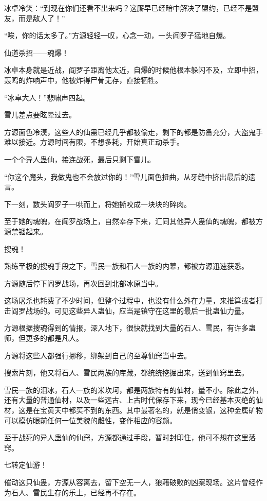\begin{this_body}
冰卓冷笑：“到现在你们还看不出来吗？这厮早已经暗中解决了盟约，已经不是盟友，而是敌人了！”

“唉，你的话太多了。”方源轻轻一叹，心念一动，一头阎罗子猛地自爆。

仙道杀招——魂爆！

冰卓本身就是近战，阎罗子距离他太近，自爆的时候他根本躲闪不及，立即中招，轰鸣的炸响声中，他被炸得尸骨无存，直接牺牲。

“冰卓大人！”悲啸声四起。

雪儿差点要眩晕过去。

方源面色冷漠，这些人的仙蛊已经几乎都被偷走，剩下的都是防备充分，大盗鬼手难以接近。方源时间有限，不想多耗，开始真正动杀手。

一个个异人蛊仙，接连战死，最后只剩下雪儿。

“你这个魔头，我做鬼也不会放过你的！”雪儿面色扭曲，从牙缝中挤出最后的遗言。

下一刻，数头阎罗子一哄而上，将她撕咬成一块块的碎肉。

至于她的魂魄，在阎罗战场上，自然幸存下来，汇同其他异人蛊仙的魂魄，都被方源禁锢起来。

搜魂！

熟练至极的搜魂手段之下，雪民一族和石人一族的内幕，都被方源迅速获悉。

方源随后停下阎罗战场，再次回到北部冰原当中。

这场屠杀也耗费了不少时间，但整个过程中，也没有什么外在力量，来推算或者打击阎罗战场的。可见这些异人蛊仙，应当是镇守在这里的最后一批蛊仙力量。

方源根据搜魂得到的情报，深入地下，很快就找到大量的石人、雪民，有许多蛊师，但更多的都是凡人。

方源将这些人都强行挪移，绑架到自己的至尊仙窍当中去。

搜索片刻，他又将石人、雪民两族的库藏，都统统挖掘出来，送到仙窍里去。

雪民一族的泪冰，石人一族的米坎坷，都是两族特有的仙材，量不小。除此之外，还有大量的普通仙材，以及一些远古、上古时代保存下来，现今已经基本灭绝的仙材，这是在宝黄天中都买不到的东西。其中最著名的，就是俏变银，这种金属矿物可以模仿眼前任何一位美貌的雌性，变作相应的容颜。

至于战死的异人蛊仙的仙窍，方源都通过手段，暂时封印住，他可不想在这里落窍。

七转定仙游！

催动这只仙蛊，方源从容离去，留下空无一人，狼藉破败的凶案现场。这片曾经作为石人、雪民生存的乐土，已经再不存在。


\end{this_body}

